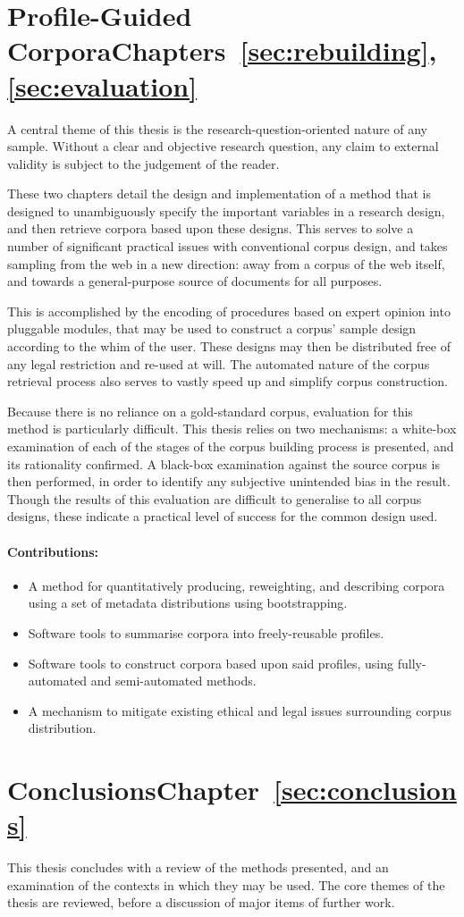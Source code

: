\section*{Profile-Guided Corpora\hfill{}Chapters~\ref{sec:rebuilding},~\ref{sec:evaluation}}
A central theme of this thesis is the research-question-oriented nature of any sample.  Without a clear and objective research question, any claim to external validity is subject to the judgement of the reader.

These two chapters detail the design and implementation of a method that is designed to unambiguously specify the important variables in a research design, and then retrieve corpora based upon these designs.  This serves to solve a number of significant practical issues with conventional corpus design, and takes sampling from the web in a new direction: away from a corpus of the web itself, and towards a general-purpose source of documents for all purposes.

This is accomplished by the encoding of procedures based on expert opinion into pluggable modules, that may be used to construct a corpus' sample design according to the whim of the user.  These designs may then be distributed free of any legal restriction and re-used at will.  The automated nature of the corpus retrieval process also serves to vastly speed up and simplify corpus construction.

Because there is no reliance on a gold-standard corpus, evaluation for this method is particularly difficult.  This thesis relies on two mechanisms: a white-box examination of each of the stages of the corpus building process is presented, and its rationality confirmed.  A black-box examination against the source corpus is then performed, in order to identify any subjective unintended bias in the result.  Though the results of this evaluation are difficult to generalise to all corpus designs, these indicate a practical level of success for the common design used.

\paragraph{Contributions:}
\begin{itemize}
    \item A method for quantitatively producing, reweighting, and describing corpora using a set of metadata distributions using bootstrapping.
    \item Software tools to summarise corpora into freely-reusable profiles.
    \item Software tools to construct corpora based upon said profiles, using fully-automated and semi-automated methods.
    \item A mechanism to mitigate existing ethical and legal issues surrounding corpus distribution.
\end{itemize}


\section*{Conclusions\hfill{}Chapter~\ref{sec:conclusions}}
This thesis concludes with a review of the methods presented, and an examination of the contexts in which they may be used.  The core themes of the thesis are reviewed, before a discussion of major items of further work.


